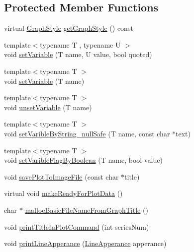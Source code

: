 \subsection*{Protected Member Functions}
\begin{DoxyCompactItemize}
\item 
virtual \hyperlink{_serial_graph_8h_adc73bce6b7e6c4ecf37dde452d6a385e}{Graph\+Style} \hyperlink{class_g_n_u_plot_line_graph_a8f8b19efd8d8f4f25ccc41635e332593}{get\+Graph\+Style} () const 
\item 
{\footnotesize template$<$typename T , typename U $>$ }\\void \hyperlink{class_g_n_u_plot_base_a03d371b0c6c7ef89064525438b22d52c}{set\+Variable} (T name, U value, bool quoted)
\item 
{\footnotesize template$<$typename T $>$ }\\void \hyperlink{class_g_n_u_plot_base_a3c8c8f68c13661d91bd844589e1a2a85}{set\+Variable} (T name)
\item 
{\footnotesize template$<$typename T $>$ }\\void \hyperlink{class_g_n_u_plot_base_af9b418bbcafb41d4d51b92018ca4f217}{unset\+Variable} (T name)
\item 
{\footnotesize template$<$typename T $>$ }\\void \hyperlink{class_g_n_u_plot_base_a68171bf36461e54e2b81384c112ad975}{set\+Varible\+By\+String\+\_\+null\+Safe} (T name, const char $\ast$text)
\item 
{\footnotesize template$<$typename T $>$ }\\void \hyperlink{class_g_n_u_plot_base_ae93c5de3241c2b6b6f703a202dc1d94b}{set\+Varible\+Flag\+By\+Boolean} (T name, bool value)
\item 
void \hyperlink{class_g_n_u_plot_base_ab5c851953dd140cc3ee936a5cd329200}{save\+Plot\+To\+Image\+File} (const char $\ast$title)
\item 
virtual void \hyperlink{class_g_n_u_plot_base_adaf91c191e4d889537d401faeb863485}{make\+Ready\+For\+Plot\+Data} ()
\item 
char $\ast$ \hyperlink{class_g_n_u_plot_base_a7f71f3c616b3a4a854f9118a04c40447}{malloc\+Basic\+File\+Name\+From\+Graph\+Title} ()
\item 
void \hyperlink{class_g_n_u_plot_base_a65ae2b3220034bce21c7feb39a632991}{print\+Title\+In\+Plot\+Command} (int series\+Num)
\item 
void \hyperlink{class_g_n_u_plot_base_ad057969aa7f8bdbe884d6a5d03a29722}{print\+Line\+Apperance} (\hyperlink{struct_line_apperance}{Line\+Apperance} apperance)

\end{DoxyCompactItemize}
